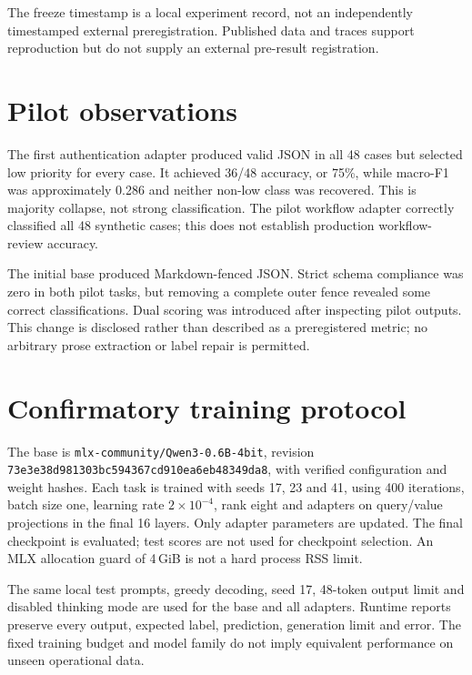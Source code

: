 \documentclass[11pt]{article}
\begin{document}
The freeze timestamp is a local experiment record, not an independently timestamped external preregistration. Published data and traces support reproduction but do not supply an external pre-result registration.

\section{Pilot observations}
The first authentication adapter produced valid JSON in all 48 cases but selected low priority for every case. It achieved 36/48 accuracy, or 75\%, while macro-F1 was approximately 0.286 and neither non-low class was recovered. This is majority collapse, not strong classification. The pilot workflow adapter correctly classified all 48 synthetic cases; this does not establish production workflow-review accuracy.

The initial base produced Markdown-fenced JSON. Strict schema compliance was zero in both pilot tasks, but removing a complete outer fence revealed some correct classifications. Dual scoring was introduced after inspecting pilot outputs. This change is disclosed rather than described as a preregistered metric; no arbitrary prose extraction or label repair is permitted.

\section{Confirmatory training protocol}
The base is \texttt{mlx-community/Qwen3-0.6B-4bit}, revision
\texttt{73e3e38d981303bc594367cd910ea6eb48349da8}, with verified configuration and weight hashes. Each task is trained with seeds 17, 23 and 41, using 400 iterations, batch size one, learning rate $2\times10^{-4}$, rank eight and adapters on query/value projections in the final 16 layers. Only adapter parameters are updated. The final checkpoint is evaluated; test scores are not used for checkpoint selection. An MLX allocation guard of 4\,GiB is not a hard process RSS limit.

The same local test prompts, greedy decoding, seed 17, 48-token output limit and disabled thinking mode are used for the base and all adapters. Runtime reports preserve every output, expected label, prediction, generation limit and error. The fixed training budget and model family do not imply equivalent performance on unseen operational data.
\end{document}
